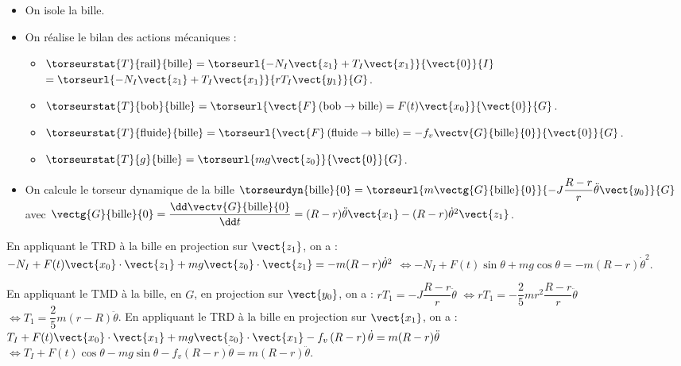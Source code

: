 \begin{corrigebox}
\begin{itemize}
\item On isole la bille. 
\item On réalise le bilan des actions mécaniques :
\begin{itemize}
\item $\torseurstat{T}{\text{rail}}{\text{bille}} = \torseurl{-N_I\vect{z_1}+T_I\vect{x_1}}{\vect{0}}{I}$ $= \torseurl{-N_I\vect{z_1}+T_I\vect{x_1}}{rT_I\vect{y_1}}{G}$.
\item $\torseurstat{T}{\text{bob}}{\text{bille}} = \torseurl{\vect{F}\left(\text{bob} \rightarrow \text{bille} \right)=F(t)\vect{x_0}}{\vect{0}}{G}$.
\item $\torseurstat{T}{\text{fluide}}{\text{bille}} = \torseurl{\vect{F}\left(\text{fluide} \rightarrow \text{bille} \right)=-f_v\vectv{G}{\text{bille}}{0}}{\vect{0}}{G}$.
\item $\torseurstat{T}{g}{\text{bille}} = \torseurl{mg\vect{z_0}}{\vect{0}}{G}$.
\end{itemize}
\item On calcule le torseur dynamique de la bille $\torseurdyn{\text{bille}}{0}=\torseurl{m\vectg{G}{\text{bille}}{0}}{-J\dfrac{R-r}{r}\ddot{\theta}\vect{y_0}}{G}$ avec $\vectg{G}{\text{bille}}{0} = \dfrac{\dd \vectv{G}{\text{bille}}{0}}{\dd t} = (R-r)\ddot{\theta}\vect{x_1} - (R-r)\dot{\theta}^2\vect{z_1}$.
\end{itemize}

En appliquant le TRD à la bille en projection sur $\vect{z_1}$, on a : 
$-N_I+F(t)\vect{x_0}\cdot\vect{z_1} +mg\vect{z_0}\cdot\vect{z_1} = - m(R-r)\dot{\theta}^2$
$\Longleftrightarrow -N_I+F(t)\sin\theta +mg\cos\theta = - m(R-r)\dot{\theta}^2 $.

En appliquant le TMD à la bille, en $G$, en projection sur $\vect{y_0}$, on a : 
$rT_1 = -J\dfrac{R-r}{r}\ddot{\theta}$
$\Longleftrightarrow rT_1 = -\dfrac{2}{5}mr^2 \dfrac{R-r}{r}\ddot{\theta}$
$\Longleftrightarrow T_1 = \dfrac{2}{5}m(r-R)\ddot{\theta}$.
En appliquant le TRD à la bille en projection sur $\vect{x_1}$, on a : 
$T_I+F(t)\vect{x_0}\cdot\vect{x_1} +mg\vect{z_0}\cdot\vect{x_1}-f_v \left(R-r\right)\dot{\theta} =  m(R-r)\ddot{\theta}$
$\Longleftrightarrow  T_I+F(t)\cos\theta-mg\sin\theta -f_v \left(R-r\right)\dot{\theta} =  m(R-r)\ddot{\theta}$.


\end{corrigebox}
